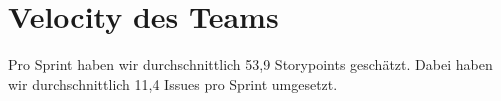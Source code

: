 \chapter{Velocity des Teams}

Pro Sprint haben wir durchschnittlich 53,9 Storypoints geschätzt. Dabei haben wir durchschnittlich 11,4 Issues pro Sprint umgesetzt.